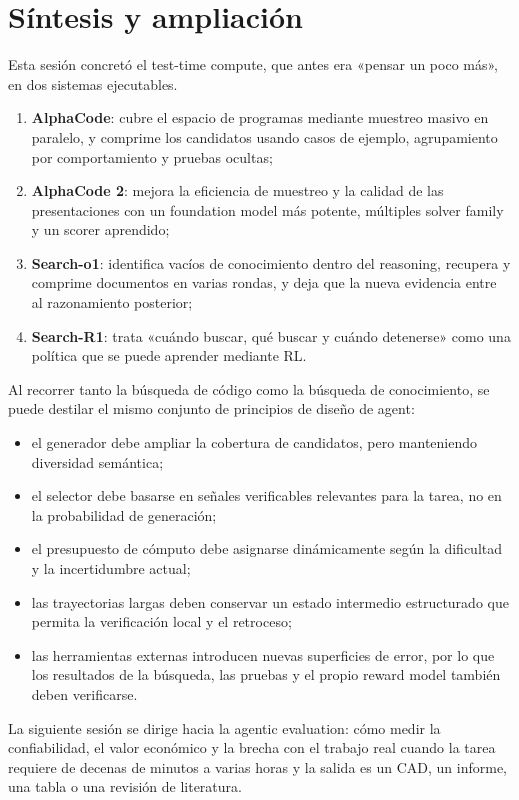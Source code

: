 \section{Síntesis y ampliación}

Esta sesión concretó el test-time compute, que antes era «pensar un poco más», en dos sistemas ejecutables.

\begin{enumerate}
    \item \textbf{AlphaCode}: cubre el espacio de programas mediante muestreo masivo en paralelo, y comprime los candidatos usando casos de ejemplo, agrupamiento por comportamiento y pruebas ocultas;
    \item \textbf{AlphaCode 2}: mejora la eficiencia de muestreo y la calidad de las presentaciones con un foundation model más potente, múltiples solver family y un scorer aprendido;
    \item \textbf{Search-o1}: identifica vacíos de conocimiento dentro del reasoning, recupera y comprime documentos en varias rondas, y deja que la nueva evidencia entre al razonamiento posterior;
    \item \textbf{Search-R1}: trata «cuándo buscar, qué buscar y cuándo detenerse» como una política que se puede aprender mediante RL.
\end{enumerate}

Al recorrer tanto la búsqueda de código como la búsqueda de conocimiento, se puede destilar el mismo conjunto de principios de diseño de agent:

\begin{itemize}
    \item el generador debe ampliar la cobertura de candidatos, pero manteniendo diversidad semántica;
    \item el selector debe basarse en señales verificables relevantes para la tarea, no en la probabilidad de generación;
    \item el presupuesto de cómputo debe asignarse dinámicamente según la dificultad y la incertidumbre actual;
    \item las trayectorias largas deben conservar un estado intermedio estructurado que permita la verificación local y el retroceso;
    \item las herramientas externas introducen nuevas superficies de error, por lo que los resultados de la búsqueda, las pruebas y el propio reward model también deben verificarse.
\end{itemize}

La siguiente sesión se dirige hacia la agentic evaluation: cómo medir la confiabilidad, el valor económico y la brecha con el trabajo real cuando la tarea requiere de decenas de minutos a varias horas y la salida es un CAD, un informe, una tabla o una revisión de literatura.


